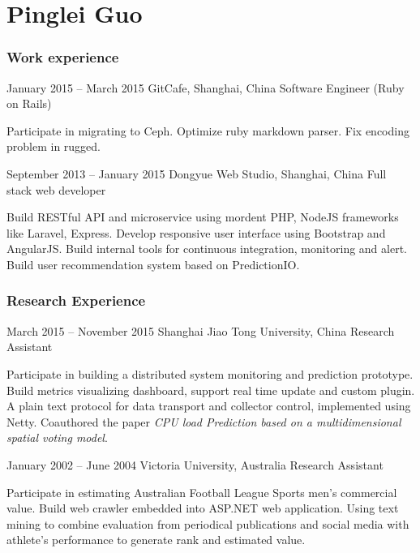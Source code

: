 \documentclass[fontsize=10pt]{tccv}
\begin{document}
\part{Pinglei Guo}

\section{Work experience}

\begin{eventlist}


\item{January 2015 -- March 2015}
     {GitCafe, Shanghai, China}
     {Software Engineer (Ruby on Rails)}

Participate in migrating to Ceph.
Optimize ruby markdown parser.
Fix encoding problem in rugged.


\item{September 2013 -- January 2015}
     {Dongyue Web Studio, Shanghai, China}
     {Full stack web developer}

Build RESTful API and microservice using mordent PHP, NodeJS frameworks like Laravel, Express.
Develop responsive user interface using Bootstrap and AngularJS.
Build internal tools for continuous integration, monitoring and alert.
Build user recommendation system based on PredictionIO.

\end{eventlist}

\section{Research Experience}

\begin{eventlist}

\item{March 2015 -- November 2015}
     {Shanghai Jiao Tong University, China}
     {Research Assistant}

Participate in building a distributed system monitoring and prediction prototype.
Build metrics visualizing dashboard, support real time update and custom plugin.
A plain text protocol for data transport and collector control, implemented using Netty.
Coauthored the paper \textit{CPU load Prediction based on a multidimensional spatial voting model}.

\item{January 2002 -- June 2004}
     {Victoria University, Australia}
     {Research Assistant}

Participate in estimating Australian Football League Sports men's commercial value.
Build web crawler embedded into ASP.NET web application.
Using text mining to combine evaluation from periodical publications and social media
with athlete's performance to generate rank and estimated value.

\end{eventlist}
\end{document}
